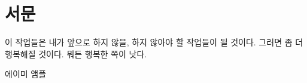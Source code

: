 \hypertarget{uxc11cuxbb38}{%

\chapter{서문}\label{uxc11cuxbb38}}



이 작업들은 내가 앞으로 하지 않을, 하지 않아야 할 작업들이 될 것이다. 그러면 좀 더 행복해질 것이다. 뭐든 행복한 쪽이 낫다.



에이미 앰플

